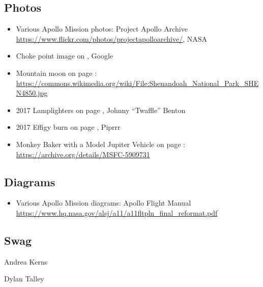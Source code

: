 


\subsection*{Photos}
\begin{itemize}[noitemsep]
\item Various Apollo Mission photos: Project Apollo Archive \url{https://www.flickr.com/photos/projectapolloarchive/}, NASA
\item Choke point image on \pageref{fig:map-choke-point}, Google
  \item Mountain moon on page \pageref{image:mountainmoom}: \url{https://commons.wikimedia.org/wiki/File:Shenandoah_National_Park_SHEN4850.jpg}
\item 2017 Lamplighters on page \pageref{fig:lamplighters2017}, Johnny ``Twaffle'' Benton
\item 2017 Effigy burn on page \pageref{image:2017effigyburn}, Piprrr
\item Monkey Baker with a Model Jupiter Vehicle on page \pageref{image:missbaker}: \url{https://archive.org/details/MSFC-5909731}
\end{itemize}


\subsection*{Diagrams}
\begin{itemize}[noitemsep]
\item Various Apollo Mission diagrams: Apollo Flight Manual \url{https://www.hq.nasa.gov/alsj/a11/a11fltpln_final_reformat.pdf}
\end{itemize}

\subsection*{Swag}

\begin{description}[leftmargin=6em,noitemsep,style=nextline]
	\item[Design:] Andrea Kerns
  \item[Creation:] Dylan Talley
\end{description}

